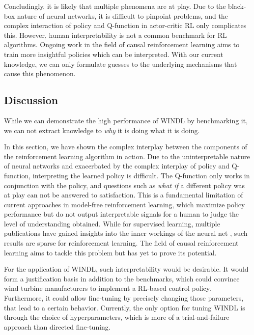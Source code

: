 Concludingly, it is likely that multiple phenomena are at play. Due to the black-box nature of neural networks, it is difficult to pinpoint problems, and the complex interaction of policy and Q-function in actor-critic RL only complicates this. However, human interpretability is not a common benchmark for RL algorithms. Ongoing work in the field of causal reinforcement learning \cite{bareinboimCausalReinforcementLearning2020} aims to train more insightful policies which can be interpreted. With our current knowledge, we can only formulate guesses to the underlying mechanisms that cause this phenomenon.

\subsection{Discussion}

While we can demonstrate the high performance of WINDL by benchmarking it, we can not extract knowledge to \textit{why} it is doing what it is doing. 

In this section, we have shown the complex interplay between the components of the reinforcement learning algorithm in action. Due to the uninterpretable nature of neural networks and exacerbated by the complex interplay of policy and Q-function, interpreting the learned policy is difficult. The Q-function only works in conjunction with the policy, and questions such as \textit{what if} a different policy was at play can not be answered to satisfaction. This is a fundamental limitation of current approaches in model-free reinforcement learning, which maximize policy performance but do not output interpretable signals for a human to judge the level of understanding obtained. While for supervised learning, multiple publications have gained insights into the inner workings of the neural net \cite{zeilerVisualizingUnderstandingConvolutional2013} \cite{mordvintsevDeepDream2015}, such results are sparse for reinforcement learning. The field of causal reinforcement learning \cite{bareinboimCausalReinforcementLearning2020} aims to tackle this problem but has yet to prove its potential.

For the application of WINDL, such interpretability would be desirable. It would form a justification basis in addition to the benchmarks, which could convince wind turbine manufacturers to implement a RL-based control policy. Furthermore, it could allow fine-tuning by precisely changing those parameters, that lead to a certain behavior. Currently, the only option for tuning WINDL is through the choice of hyperparameters, which is more of a trial-and-failure approach than directed fine-tuning.